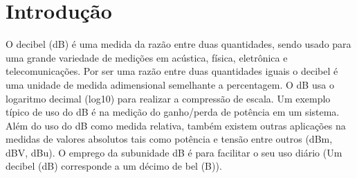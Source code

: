 \section*{Introdução}
        O decibel (dB) é uma medida da razão entre duas quantidades,
    sendo usado para uma grande variedade de medições em acústica,
    física, eletrônica e telecomunicações. Por ser uma razão entre duas
    quantidades iguais o decibel é uma unidade de medida adimensional
    semelhante a percentagem. O dB usa o logaritmo decimal (log10) para
    realizar a compressão de escala. Um exemplo típico de uso do dB é na
    medição do ganho/perda de potência em um sistema. Além do uso do
    dB como medida relativa, também existem outras aplicações na
    medidas de valores absolutos tais como potência e tensão entre outros
    (dBm, dBV, dBu). O emprego da subunidade dB é para facilitar o seu
    uso diário (Um decibel (dB) corresponde a um décimo de bel (B)). \cite{apostila_ifsc}
